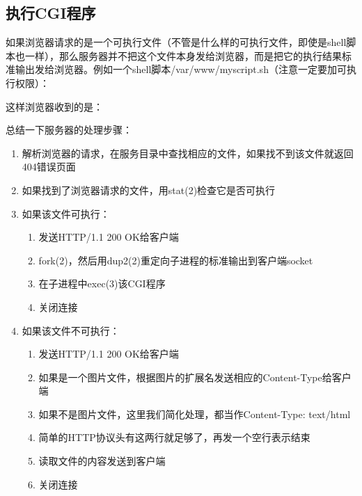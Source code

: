 \subsection{执行CGI程序}
%


如果浏览器请求的是一个可执行文件（不管是什么样的可执行文件，即使是shell脚本也一样），那么服务器并不把这个文件本身发给浏览器，而是把它的执行结果标准输出发给浏览器。例如一个shell脚本/var/\BookSplit{}www/\BookSplit{}myscript.\BookSplit{}sh（注意一定要加可执行权限）：




这样浏览器收到的是：




总结一下服务器的处理步骤：


\begin{enumerate}

\item 解析浏览器的请求，在服务目录中查找相应的文件，如果找不到该文件就返回404错误页面

\item 如果找到了浏览器请求的文件，用stat(2)检查它是否可执行

\item 如果该文件可执行：


\begin{enumerate}[label=\alph*.]

\item 发送HTTP/\BookSplit{}1.\BookSplit{}1 200 OK给客户端

\item fork(2)，然后用dup2(2)重定向子进程的标准输出到客户端socket

\item 在子进程中exec(3)该CGI程序

\item 关闭连接
\end{enumerate}

\item 如果该文件不可执行：


\begin{enumerate}[label=\alph*.]

\item 发送HTTP/\BookSplit{}1.\BookSplit{}1 200 OK给客户端

\item 如果是一个图片文件，根据图片的扩展名发送相应的Content-Type给客户端

\item 如果不是图片文件，这里我们简化处理，都当作Content-Type:\BookSplit{} text/\BookSplit{}html

\item 简单的HTTP协议头有这两行就足够了，再发一个空行表示结束

\item 读取文件的内容发送到客户端

\item 关闭连接
\end{enumerate}
\end{enumerate}

